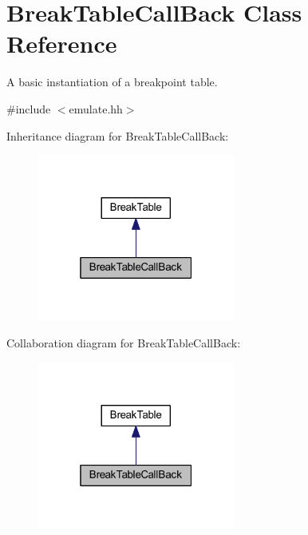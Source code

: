 \hypertarget{class_break_table_call_back}{}\section{Break\+Table\+Call\+Back Class Reference}
\label{class_break_table_call_back}


A basic instantiation of a breakpoint table.  




{\ttfamily \#include $<$emulate.\+hh$>$}



Inheritance diagram for Break\+Table\+Call\+Back\+:
\nopagebreak
\begin{figure}[H]
\begin{center}
\leavevmode
\includegraphics[width=184pt]{class_break_table_call_back__inherit__graph}
\end{center}
\end{figure}


Collaboration diagram for Break\+Table\+Call\+Back\+:
\nopagebreak
\begin{figure}[H]
\begin{center}
\leavevmode
\includegraphics[width=184pt]{class_break_table_call_back__coll__graph}
\end{center}
\end{figure}
